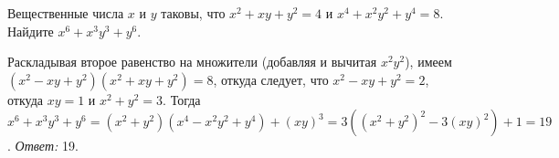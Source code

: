 Вещественные числа $x$ и $y$ таковы, что
$x^2 + x y + y^2 = 4$ и $x^4 + x^2 y^2 + y^4 = 8$.
Найдите $x^6 + x^3 y^3 + y^6$.

\solution
Раскладывая второе равенство на множители (добавляя и вычитая $x^2 y^2$), имеем
$(x^2 - x y + y^2) (x^2 + x y + y^2) = 8$,
откуда следует, что $x^2  - x y + y^2 = 2$,
откуда $x y = 1$ и $x^2 + y^2 = 3$.
Тогда
\(
    x^6 + x^3 y^3 + y^6
=
    (x^2 + y^2) (x^4 - x^2 y^2 + y^4) + (x y)^3
=
    3((x^2 + y^2)^2 - 3 (x y)^2) + 1 = 19
\).
\emph{Ответ:} 19.

